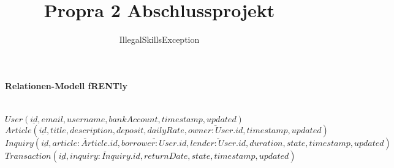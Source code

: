 \documentclass{article}
\begin{document}
\title{Propra 2 Abschlussprojekt}
\author{IllegalSkillsException}

\maketitle

\paragraph{Relationen-Modell fRENTly} \hspace{5pt} \\
\newline
$ User (\underline{id}, email, username, bankAccount, timestamp, updated)$ \newline \newline
$ Article (\underline{id}, title, description, deposit, dailyRate, \overline{owner:User.id}, timestamp, updated) $ \newline \newline
$ Inquiry (\underline{id}, \overline{article:Article.id}, \overline{borrower:User.id},\overline{lender:User.id}, duration, state, timestamp, updated) $ \newline \newline
$ Transaction (\underline{id}, \overline{inquiry:Inquiry.id}, returnDate, state, timestamp, updated) $ \newline \newline
\end{document}
